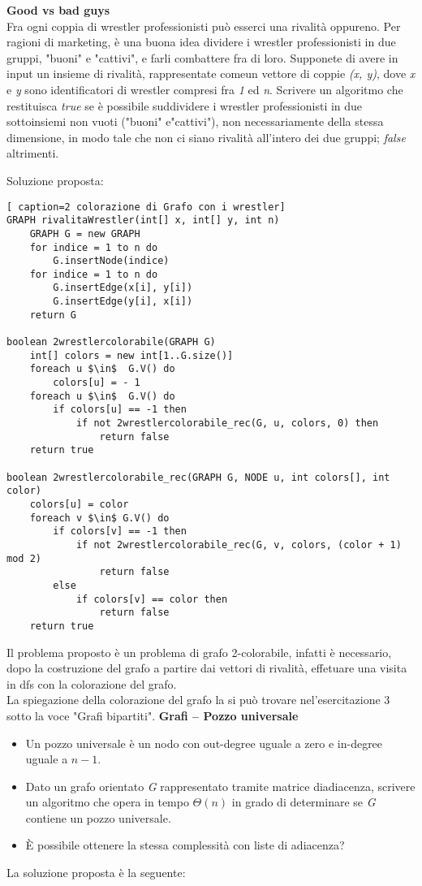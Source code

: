 \documentclass[../cheatSheetAlgoritmi.tex]{subfiles}
\begin{document}
\bigskip
\textbf{Good vs bad guys}\\
Fra ogni coppia di wrestler professionisti può esserci una rivalità oppureno. Per ragioni di marketing, è una buona idea dividere i wrestler professionisti in due gruppi, "buoni" e "cattivi", e farli combattere fra di loro. Supponete di avere in input un insieme di rivalità, rappresentate comeun vettore di coppie \textit{(x, y)}, dove \textit{x} e \textit{y} sono identificatori di wrestler compresi fra \textit{1} ed \textit{n}. Scrivere un algoritmo che restituisca \textit{true} se è possibile suddividere i wrestler professionisti in due sottoinsiemi non vuoti ("buoni" e"cattivi"), non necessariamente della stessa dimensione, in modo tale che non ci siano rivalità all’intero dei due gruppi; \textit{false} altrimenti.
\newpage
\begin{flushleft}
Soluzione proposta:
\end{flushleft}
\begin{lstlisting}[ caption=2 colorazione di Grafo con i wrestler]
GRAPH rivalitaWrestler(int[] x, int[] y, int n)
	GRAPH G = new GRAPH
  	for indice = 1 to n do
    	G.insertNode(indice)
  	for indice = 1 to n do
    	G.insertEdge(x[i], y[i])
    	G.insertEdge(y[i], x[i])
  	return G

boolean 2wrestlercolorabile(GRAPH G)
	int[] colors = new int[1..G.size()]
  	foreach u $\in$  G.V() do
    	colors[u] = - 1
  	foreach u $\in$  G.V() do
    	if colors[u] == -1 then
      		if not 2wrestlercolorabile_rec(G, u, colors, 0) then
        		return false
  	return true

boolean 2wrestlercolorabile_rec(GRAPH G, NODE u, int colors[], int color)
	colors[u] = color
  	foreach v $\in$ G.V() do
    	if colors[v] == -1 then
      		if not 2wrestlercolorabile_rec(G, v, colors, (color + 1) mod 2)
        		return false
    	else
      		if colors[v] == color then
        		return false
  	return true
\end{lstlisting}
Il problema proposto è un problema di grafo 2-colorabile, infatti è necessario, dopo la costruzione del grafo a partire dai vettori di rivalità, effetuare una visita in dfs con la colorazione del grafo. \\
La spiegazione della colorazione del grafo la si può trovare nel'esercitazione 3 sotto la voce "Grafi bipartiti".
\newpage
\textbf{Grafi – Pozzo universale}

\begin{itemize}
	\item Un pozzo universale è un nodo con out-degree uguale a zero e in-degree uguale a $n-1$.
	\item Dato un grafo orientato \textit{G} rappresentato tramite matrice diadiacenza, scrivere un algoritmo che opera in tempo $\Theta(n)$ in grado di determinare se \textit{G} contiene un pozzo universale.
	\item È possibile ottenere la stessa complessità con liste di adiacenza?
\end{itemize}
La soluzione proposta è la seguente:
\end{document}
